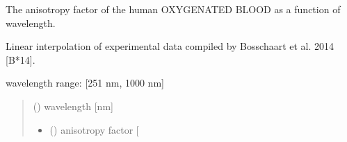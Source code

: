 \documentclass[letterpaper,10pt,english]{sphinxmanual}
\begin{document}
\begin{fulllineitems}
\label{\detokenize{06_anisotropy_factor:skinoptics.anisotropy_factor.g_Bosschaart}}
\pysigstartsignatures
{}
\pysigstopsignatures
\begin{DUlineblock}{0em}
\item[] The anisotropy factor of the human OXYGENATED BLOOD as a function of wavelength.
\item[] Linear interpolation of experimental data compiled by Bosschaart et al. 2014 {[}B*14{]}.
\end{DUlineblock}

\sphinxAtStartPar
wavelength range: {[}251 nm, 1000 nm{]}
\begin{quote}\begin{description}
\sphinxAtStartPar
{} () \textendash{} wavelength {[}nm{]}

\sphinxAtStartPar
\begin{itemize}
\item {} 
\sphinxAtStartPar
{} () \textendash{} anisotropy factor {[}\sphinxhyphen{}{]}

\end{itemize}


\end{description}\end{quote}

\end{fulllineitems}

\end{document}
